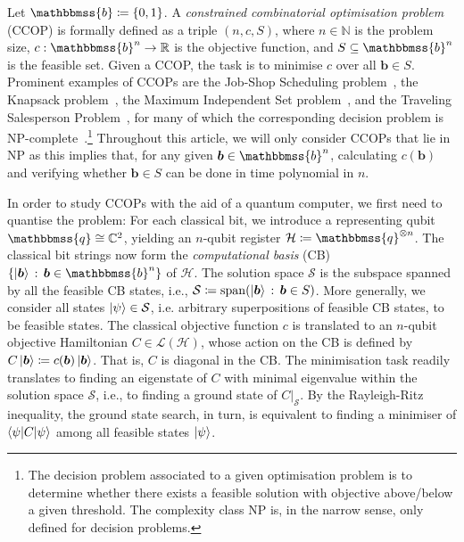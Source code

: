 \documentclass[10pt,conference]{IEEEtran}
\DeclareMathOperator{\spn}{span}      %
\newcommand*{\N}{\mathbb{N}}          %
\newcommand*{\R}{\mathbb{R}}          %
\newcommand*{\C}{\mathbb{C}}          %
\newcommand*{\hil}{\mathcal{H}}       %
\newcommand*{\defcolon}{\,:\,}        %
\newcommand*{\bit}{\mathbbmss{b}}     %
\newcommand*{\qubit}{\mathbbmss{q}}   %
\newcommand*{\solset}{S}              %
\newcommand*{\solspace}{\mathcal{S}}  %
\newcommand*{\lo}{\mathcal{L}}        %
\begin{document}
Let $\bit \coloneqq \{0, 1\}$.
A \emph{constrained combinatorial optimisation problem} (CCOP) is formally defined as a triple $(n, c, \solset)$, where $n \in \N$ is the problem size, $c : \bit^{n} \rightarrow \R$ is the objective function, and $\solset \subseteq \bit^{n}$ is the feasible set.
Given a CCOP, the task is to minimise $c$ over all $\bm{b} \in \solset$.
Prominent examples of CCOPs are the Job-Shop Scheduling problem~\cite{Zhang2017ReviewOfJobShopSchedulingResearchAndItsNewPerspectivesUnderIndustry40}, the Knapsack problem~\cite{Kellerer2004KnapsackProblems}, the Maximum Independent Set problem~\cite{Tarjan1977FindingAMaximumIndependentSet}, and the Traveling Salesperson Problem~\cite{Applegate2009CertificationOfAnOptimalTspTourThrough85900Cities}, for many of which the corresponding decision problem is NP-complete~\cite{Karp1972ReducibilityAmongCombinatorialProblems}.\footnote{
    The decision problem associated to a given optimisation problem is to determine whether there exists a feasible solution with objective above/below a given threshold.
    The complexity class NP is, in the narrow sense, only defined for decision problems.
}
Throughout this article, we will only consider CCOPs that lie in NP as this implies that, for any given $\bm{b} \in \bit^{n}$, calculating $c(\bm{b})$ and verifying whether $\bm{b} \in \solset$ can be done in time polynomial in $n$.

In order to study CCOPs with the aid of a quantum computer, we first need to quantise the problem:
For each classical bit, we introduce a representing qubit $\qubit \cong \C^{2}$, yielding an $n$-qubit register $\hil \coloneqq \qubit^{\otimes n}$.
The classical bit strings now form the \emph{computational basis} (CB) $\{\ket{\bm{b}} \defcolon \bm{b} \in \bit^{n}\}$ of $\hil$.
The solution space $\solspace$ is the subspace spanned by all the feasible CB states, i.e., $\solspace \coloneqq \spn(\ket{\bm{b}} \defcolon \bm{b} \in \solset)$.
More generally, we consider all states $\ket{\psi} \in \solspace$, i.e. arbitrary superpositions of feasible CB states, to be feasible states.
The classical objective function $c$ is translated to an $n$-qubit objective Hamiltonian $C \in \lo(\hil)$, whose action on the CB is defined by $C \ket{\bm{b}} \coloneqq c(\bm{b}) \ket{\bm{b}}$.
That is, $C$ is diagonal in the CB.
The minimisation task readily translates to finding an eigenstate of $C$ with minimal eigenvalue within the solution space $\solspace$, i.e., to finding a ground state of $C\vert_{\solspace}$.
By the Rayleigh-Ritz inequality, the ground state search, in turn, is equivalent to finding a minimiser of $\braket{\psi | C | \psi}$ among all feasible states $\ket{\psi}$.
\end{document}
